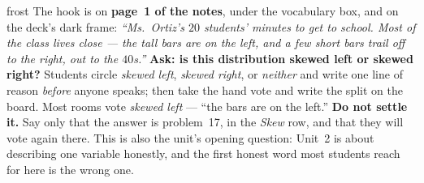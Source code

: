 \documentclass[10pt]{article}
\begin{document}
\boxguard
\begin{skillbox}{frost}
The hook is on \textbf{page~1 of the notes}, under the vocabulary box, and on the deck's dark
frame: \textit{``Ms.~Ortiz's $20$ students' minutes to get to school. Most of the class lives
close --- the tall bars are on the left, and a few short bars trail off to the right, out to the
$40$s.''} \textbf{Ask: is this distribution skewed left or skewed right?} Students circle
\emph{skewed left}, \emph{skewed right}, or \emph{neither} and write one line of reason \emph{before}
anyone speaks; then take the hand vote and write the split on the board. Most rooms vote
\emph{skewed left} --- ``the bars are on the left.'' \textbf{Do not settle it.} Say only that
the answer is problem~17, in the \emph{Skew} row, and that they will vote again there. This is
also the unit's opening question: Unit~2 is about describing one variable honestly, and the
first honest word most students reach for here is the wrong one.
\end{skillbox}
\end{document}
